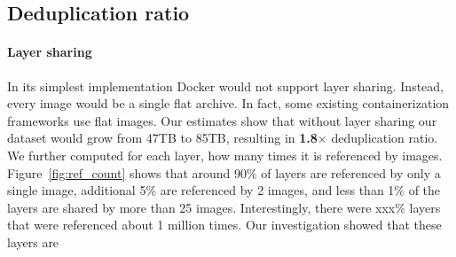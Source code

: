 \subsection{Deduplication ratio} 
\label{sec:dedup_ratio}

%
%
%

\paragraph{Layer sharing}



In its simplest implementation Docker would not support layer sharing.
%
Instead, every image would be a single flat archive.
%
In fact, some existing containerization frameworks  use flat images.
%
Our estimates show that without layer sharing our dataset would grow from 47TB
to 85TB, resulting in \textbf{1.8$\times$} deduplication ratio.
% 
We further computed for each layer, how many times it is referenced by images.
%
Figure~\ref{fig:ref_count} shows that around 90\% of layers are referenced by
only a single image, additional 5\% are referenced by 2 images, and less than
1\% of the layers are shared by more than 25 images.
%
%
%
%
%
%
%
Interestingly, there were xxx\% layers that were referenced about 1 million
times.
%
Our investigation showed  that these layers are~

